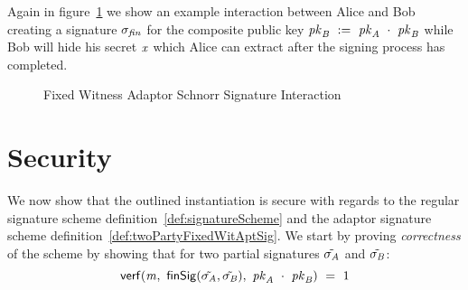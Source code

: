 Again in figure~\ref{fig:aptSchnorrInteraction} we show an example interaction between Alice and Bob creating a signature $\sigma_{\mathit{fin}}$ for the composite public key $\mathit{pk}_{\mathit{B}} ~:=~ \mathit{pk}_{\mathit{A}} ~\cdot~ \mathit{pk}_{\mathit{B}}$
while Bob will hide his secret $\mathit{x}$ which Alice can extract after the signing process has completed.

\begin{figure}
    \caption{Fixed Witness Adaptor Schnorr Signature Interaction}
    \label{fig:aptSchnorrInteraction}
\end{figure}

\section{Security}\label{sec:twopartyAptSecurity}

We now show that the outlined instantiation is secure with regards to the regular signature scheme definition~\ref{def:signatureScheme} and the adaptor signature scheme definition~\ref{def:twoPartyFixedWitAptSig}.
We start by proving \textit{correctness} of the scheme by showing that for two partial signatures $\tilde{\sigma_{\mathit{A}}}$ and $\tilde{\sigma_{\mathit{B}}}$:
\[ \mathsf{verf}(\mathit{m} ,~ \mathsf{finSig}(\tilde{\sigma_{\mathit{A}}},\tilde{\sigma_{\mathit{B}}}) ,~ \mathit{pk}_{\mathit{A}} ~\cdot~ \mathit{pk}_{\mathit{B}}) ~=~ 1 \]

